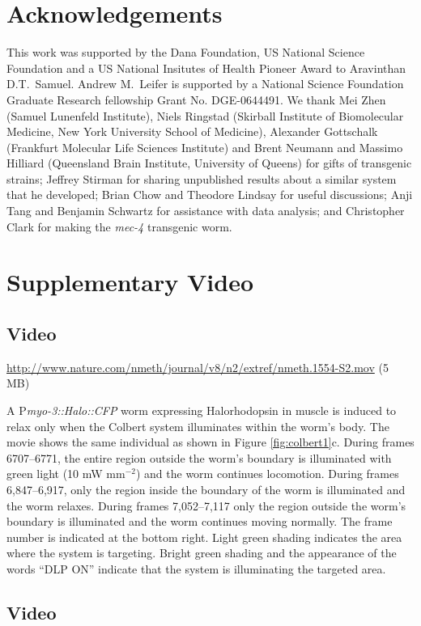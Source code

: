 \section{Acknowledgements}
This work was supported by the Dana Foundation, US National Science Foundation and a US National Insitutes of Health Pioneer Award to Aravinthan D.T.~Samuel. Andrew M.~Leifer is supported by a National Science Foundation Graduate Research fellowship Grant No. DGE-0644491. We thank Mei Zhen (Samuel Lunenfeld Institute), Niels Ringstad (Skirball Institute of Biomolecular Medicine, New York University School of Medicine), Alexander Gottschalk (Frankfurt Molecular Life Sciences Institute) and Brent Neumann and Massimo Hilliard (Queensland Brain Institute, University of Queens) for gifts of transgenic strains; Jeffrey Stirman for sharing unpublished results about a similar system that he developed; Brian Chow and Theodore Lindsay for useful discussions; Anji Tang and Benjamin Schwartz for assistance with data analysis; and Christopher Clark for making the \textit{mec-4} transgenic worm.


\section{Supplementary Video}
\subsection{Video}\label{movie:colbert1} %
\url{http://www.nature.com/nmeth/journal/v8/n2/extref/nmeth.1554-S2.mov} (5 MB)

A P\textit{myo-3::Halo::CFP} worm expressing Halorhodopsin in muscle is induced to relax only when the Colbert system illuminates within the worm's body. The movie shows the same individual as shown in Figure \ref{fig:colbert1}c. During frames 6707–6771, the entire region outside the worm's boundary is illuminated with green light (10 mW mm$^{−2}$) and the worm continues locomotion. During frames 6,847–6,917, only the region inside the boundary of the worm is illuminated and the worm relaxes. During frames 7,052–7,117 only the region outside the worm's boundary is illuminated and the worm continues moving normally. The frame number is indicated at the bottom right. Light green shading indicates the area where the system is targeting. Bright green shading and the appearance of the words “DLP ON” indicate that the system is illuminating the targeted area.

\subsection{Video}\label{movie:colbert2} %

